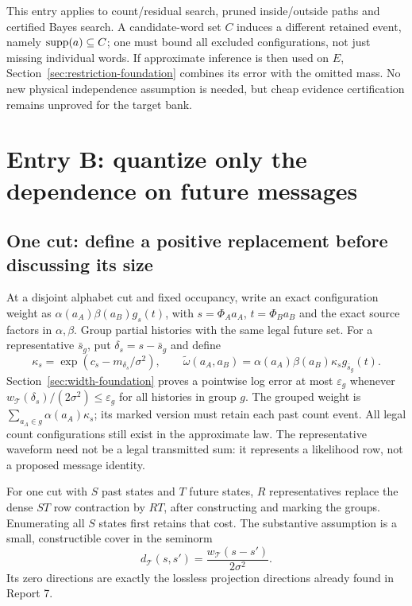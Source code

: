 \documentclass[10pt,a4paper]{article}
\begin{document}
This entry applies to count/residual search, pruned inside/outside paths and certified Bayes search. A
candidate-word set $C$ induces a different retained event, namely $\operatorname{supp}(a)\subseteq C$; one must bound
all excluded configurations, not just missing individual words. If approximate inference is then used on
$E$, Section~\ref{sec:restriction-foundation} combines its error with the omitted mass. No new physical
independence assumption is needed, but cheap evidence certification remains unproved for the target bank.

\clearpage
\section{Entry B: quantize only the dependence on future messages}
\label{sec:entry-continuation}
\subsection{One cut: define a positive replacement before discussing its size}
At a disjoint alphabet cut and fixed occupancy, write an exact configuration weight as
$\alpha(a_A)\beta(a_B)g_s(t)$, with $s=\Phi_Aa_A$, $t=\Phi_Ba_B$ and the exact source factors in
$\alpha,\beta$. Group partial histories with the same legal future set. For a representative $\bar s_g$,
put $\delta_s=s-\bar s_g$ and define
\[
 \kappa_s=\exp(c_s-m_{\delta_s}/\sigma^2),\qquad
 \widetilde\omega(a_A,a_B)=\alpha(a_A)\beta(a_B)\kappa_s g_{\bar s_g}(t).
\]
Section~\ref{sec:width-foundation} proves a pointwise log error at most
$\varepsilon_g$ whenever $w_{\mathcal T}(\delta_s)/(2\sigma^2)\leq\varepsilon_g$ for all histories in
group $g$. The grouped weight is $\sum_{a_A\in g}\alpha(a_A)\kappa_s$; its marked version must retain each
past count event. All legal count configurations still exist in the approximate law. The representative
waveform need not be a legal transmitted sum: it represents a likelihood row, not a proposed message identity.

For one cut with $S$ past states and $T$ future states, $R$ representatives replace the dense $ST$ row
contraction by $RT$, after constructing and marking the groups. Enumerating all $S$ states first retains
that cost. The substantive assumption is a small, constructible cover in the seminorm
\begin{equation}
 d_{\mathcal T}(s,s')=\frac{w_{\mathcal T}(s-s')}{2\sigma^2}.
 \label{eq:future-seminorm}
\end{equation}
Its zero directions are exactly the lossless projection directions already found in Report 7.
\end{document}
